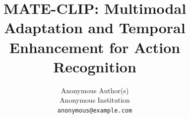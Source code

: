 \documentclass[10pt,twocolumn,letterpaper]{article}
\title{MATE-CLIP: Multimodal Adaptation and Temporal Enhancement for Action Recognition}
\author{Anonymous Author(s)\\
Anonymous Institution\\
{\tt\small anonymous@example.com}
}
\begin{document}
\maketitle






{
    \small
    
    
}

% 
\end{document}
